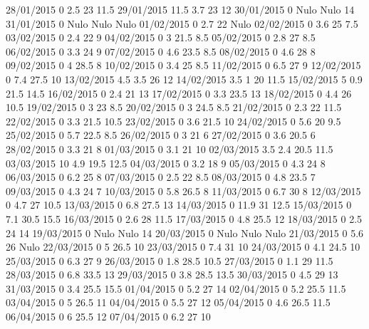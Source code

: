 28/01/2015  0      2.5    23     11.5 
29/01/2015  11.5   3.7    23     12 
30/01/2015  0     Nulo   Nulo    14 
31/01/2015  0     Nulo   Nulo   Nulo
01/02/2015  0      2.7    22    Nulo
02/02/2015  0      3.6    25     7.5 
03/02/2015  0      2.4    22     9 
04/02/2015  0      3      21.5   8.5 
05/02/2015  0      2.8    27     8.5 
06/02/2015  0      3.3    24     9 
07/02/2015  0      4.6    23.5   8.5 
08/02/2015  0      4.6    28     8 
09/02/2015  0      4      28.5   8 
10/02/2015  0      3.4    25     8.5 
11/02/2015  0      6.5    27     9 
12/02/2015  0      7.4    27.5   10 
13/02/2015  4.5    3.5    26     12 
14/02/2015  3.5    1      20     11.5 
15/02/2015  5      0.9    21.5   14.5 
16/02/2015  0      2.4    21     13 
17/02/2015  0      3.3    23.5   13 
18/02/2015  0      4.4    26     10.5 
19/02/2015  0      3      23     8.5 
20/02/2015  0      3      24.5   8.5 
21/02/2015  0      2.3    22     11.5 
22/02/2015  0      3.3    21.5   10.5 
23/02/2015  0      3.6    21.5   10 
24/02/2015  0      5.6    20     9.5 
25/02/2015  0      5.7    22.5   8.5 
26/02/2015  0      3      21     6 
27/02/2015  0      3.6    20.5   6 
28/02/2015  0      3.3    21     8 
01/03/2015  0      3.1    21     10 
02/03/2015  3.5    2.4    20.5   11.5 
03/03/2015  10     4.9    19.5   12.5 
04/03/2015  0      3.2    18     9 
05/03/2015  0      4.3    24     8 
06/03/2015  0      6.2    25     8 
07/03/2015  0      2.5    22     8.5 
08/03/2015  0      4.8    23.5   7 
09/03/2015  0      4.3    24     7 
10/03/2015  0      5.8    26.5   8 
11/03/2015  0      6.7    30     8 
12/03/2015  0      4.7    27     10.5 
13/03/2015  0      6.8    27.5   13 
14/03/2015  0      11.9   31     12.5 
15/03/2015  0      7.1    30.5   15.5 
16/03/2015  0      2.6    28     11.5 
17/03/2015  0      4.8    25.5   12 
18/03/2015  0      2.5    24     14 
19/03/2015  0     Nulo   Nulo    14 
20/03/2015  0     Nulo   Nulo   Nulo
21/03/2015  0      5.6    26    Nulo
22/03/2015  0      5      26.5   10 
23/03/2015  0      7.4    31     10 
24/03/2015  0      4.1    24.5   10 
25/03/2015  0      6.3    27     9 
26/03/2015  0      1.8    28.5   10.5 
27/03/2015  0      1.1    29     11.5 
28/03/2015  0      6.8    33.5   13 
29/03/2015  0      3.8    28.5   13.5 
30/03/2015  0      4.5    29     13 
31/03/2015  0      3.4    25.5   15.5 
01/04/2015  0      5.2    27     14 
02/04/2015  0      5.2    25.5   11.5 
03/04/2015  0      5      26.5   11 
04/04/2015  0      5.5    27     12 
05/04/2015  0      4.6    26.5   11.5 
06/04/2015  0      6      25.5   12 
07/04/2015  0      6.2    27     10 

